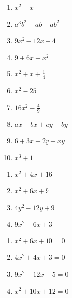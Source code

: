 \begin{enumerate}[label=\thesubsection.\arabic*]


\begin{multicols}{2}
\begin{enumerate}[label=\alph*)]
\item $x^2-x$

\item $a^3b^2-ab+ab^2$

\item $9x^2-12x+4$

\item $9+6x+x^2$

\item $x^2+x+\frac{1}{4}$

\item $x^2-25$

\item $16x^2-\frac{4}{9}$

\item $ax+bx+ay+by$

\item $6+3x+2y+xy$

\item $x^3+1$
\end{enumerate}
\end{multicols}



\begin{multicols}{2}
\begin{enumerate}[label=\alph*)]
\item $x^2+4x+16$

\item $x^2+6x+9$

\item $4y^2-12y+9$

\item $9x^2-6x+3$
\end{enumerate}
\end{multicols}


\begin{multicols}{2}
\begin{enumerate}[label=\alph*)]
\item $x^2 +6x + 10 = 0$

\item $4x^2 +4x + 3 = 0 $

\item $9x^2 - 12x + 5  = 0$

\item $x^2 + 10x + 12  = 0$
\end{enumerate}
\end{multicols}

\end{enumerate}

